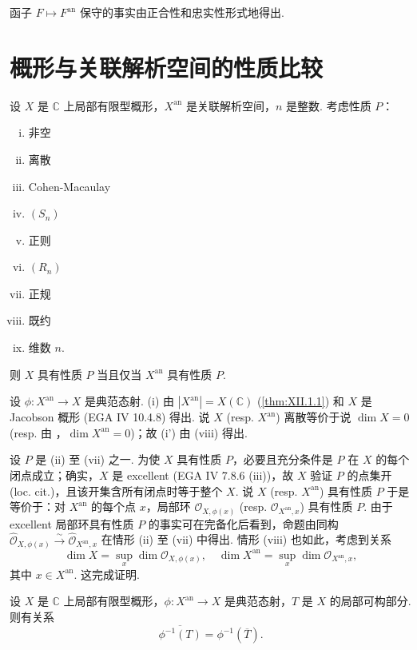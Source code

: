 函子 $F \mapsto F^{\mathrm{an}}$ 保守的事实由正合性和忠实性形式地得出.

\section{概形与关联解析空间的性质比较}

\begin{proposition}\label{prop:XII.2.1}
设 $X$ 是 $\mathbb{C}$ 上局部有限型概形，$X^{\mathrm{an}}$ 是关联解析空间，$n$ 是整数. 考虑性质 $P$：
\begin{enumerate}[i)]
\item 非空
\item[i')] 离散
\item[ii)] Cohen-Macaulay
\item[iii)] $(S_n)$
\item[iv)] 正则
\item[v)] $(R_n)$
\item[vi)] 正规
\item[vii)] 既约
\item[viii)] 维数 $n$.
\end{enumerate}
则 $X$ 具有性质 $P$ 当且仅当 $X^{\mathrm{an}}$ 具有性质 $P$.
\end{proposition}

设 $\phi \colon X^{\mathrm{an}} \to X$ 是典范态射. (i) 由 $|X^{\mathrm{an}}| = X(\mathbb{C})$ (\cref{thm:XII.1.1}) 和 $X$ 是 Jacobson 概形 (EGA IV 10.4.8) 得出. 说 $X$ (resp. $X^{\mathrm{an}}$) 离散等价于说 $\dim X = 0$ (resp. 由 \cite[第 19 号 §4 推论 6]{exp12-4}，$\dim X^{\mathrm{an}} = 0$)；故 (i') 由 (viii) 得出.

设 $P$ 是 (ii) 至 (vii) 之一. 为使 $X$ 具有性质 $P$，必要且充分条件是 $P$ 在 $X$ 的每个闭点成立；确实，$X$ 是 excellent (EGA IV 7.8.6 (iii))，故 $X$ 验证 $P$ 的点集开 (loc. cit.)，且该开集含所有闭点时等于整个 $X$. 说 $X$ (resp. $X^{\mathrm{an}}$) 具有性质 $P$ 于是等价于：对 $X^{\mathrm{an}}$ 的每个点 $x$，局部环 $\mathcal{O}_{X,\phi(x)}$ (resp. $\mathcal{O}_{X^{\mathrm{an}},x}$) 具有性质 $P$. 由于 excellent 局部环具有性质 $P$ 的事实可在完备化后看到，命题由同构 $\widehat{\mathcal{O}}_{X,\phi(x)} \xrightarrow{\sim} \widehat{\mathcal{O}}_{X^{\mathrm{an}},x}$ 在情形 (ii) 至 (vii) 中得出. 情形 (viii) 也如此，考虑到关系
\[
\dim X = \sup_x \dim \mathcal{O}_{X,\phi(x)}, \quad \dim X^{\mathrm{an}} = \sup_x \dim \mathcal{O}_{X^{\mathrm{an}},x},
\]
其中 $x \in X^{\mathrm{an}}$. 这完成证明.

\begin{proposition}\label{prop:XII.2.2}
设 $X$ 是 $\mathbb{C}$ 上局部有限型概形，$\phi \colon X^{\mathrm{an}} \to X$ 是典范态射，$T$ 是 $X$ 的局部可构部分. 则有关系
\[
\overline{\phi^{-1}(T)} = \phi^{-1}(\overline{T}).
\]
\end{proposition}


